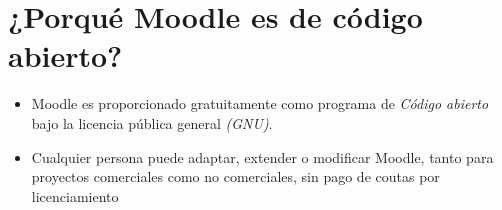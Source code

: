 \documentclass{beamer}
\begin{document}
\section{¿Porqué Moodle es de código abierto?}
\begin{center}
\begin{itemize}
\item Moodle es proporcionado gratuitamente como programa de \textit{Código abierto} bajo la licencia pública general 
\textit{(GNU)}.
\item Cualquier persona puede adaptar, extender o modificar Moodle, tanto para proyectos comerciales como no comerciales, sin 
pago de coutas por licenciamiento 
\end{itemize}
\end{center}
\end{document}
